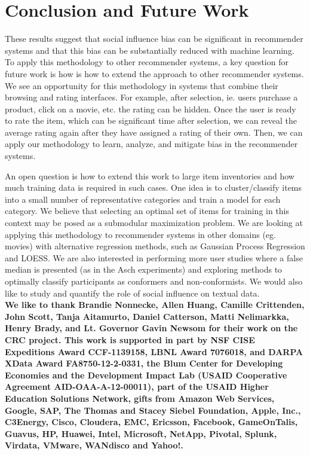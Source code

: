 \section{Conclusion and Future Work}
These results suggest that social influence bias can be significant in
recommender systems and that this bias can be substantially reduced
with machine learning. 
To apply this methodology to other recommender systems, a key question
for future work is how is how to extend the approach to other recommender systems.
We see an opportunity for this methodology in systems that combine their browsing and rating interfaces.
For example, after selection, ie. users purchase a product, click on a movie, etc. the rating can be hidden.
Once the user is ready to rate the item, which can be significant time after selection, we can reveal the average rating again after they have assigned a rating of their own. 
Then, we can apply our methodology to learn, analyze, and mitigate bias in the recommender systems.

An open question is how to extend this work to large item inventories and how much training data is required in such cases.  
One idea is to cluster/classify items into a small number of representative categories and train a model for each category.  
We believe that selecting an optimal set of items for training in this context may be posed as a submodular maximization problem.  
We are looking at applying this methodology to recommender systems in other domains (eg. movies) with alternative regression methods, such as Gaussian Process Regression and LOESS.
We are also interested in performing more user studies where a false median is presented (as in the Asch experiments) and exploring methods to
optimally classify participants as conformers and non-conformists.  
We would also like to study and quantify the role of social influence on textual data.\\
\scriptsize
\textbf{We like to thank Brandie Nonnecke, Allen Huang, Camille Crittenden, John Scott, Tanja Aitamurto, Daniel Catterson, Matti Nelimarkka, Henry Brady, and Lt. Governor Gavin Newsom for their work on the CRC project. This work is supported in part by NSF CISE Expeditions Award CCF-1139158, LBNL Award 7076018, and DARPA XData Award FA8750-12-2-0331, the Blum Center for Developing Economies and the Development Impact Lab (USAID Cooperative Agreement AID-OAA-A-12-00011), part of the USAID Higher Education Solutions Network, gifts from Amazon Web Services, Google, SAP,  The Thomas and Stacey Siebel Foundation, Apple, Inc., C3Energy, Cisco, Cloudera, EMC, Ericsson, Facebook, GameOnTalis, Guavus, HP, Huawei, Intel, Microsoft, NetApp, Pivotal, Splunk, Virdata, VMware, WANdisco and Yahoo!.}




